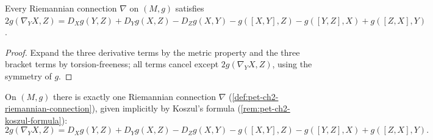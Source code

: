 \begin{lemma}
  \label{lem:pet-ch2-riemannian-connection-koszul}
  \leanok
  Every Riemannian connection $\nabla$ on $(M,g)$ satisfies
  $2g(\nabla_YX,Z)=D_Xg(Y,Z)+D_Yg(X,Z)-D_Zg(X,Y)
  -g([X,Y],Z)-g([Y,Z],X)+g([Z,X],Y)$.
\end{lemma}
\begin{proof}
  \leanok
  Expand the three derivative terms by the metric property and the three
  bracket terms by torsion-freeness; all terms cancel except
  $2g(\nabla_YX,Z)$, using the symmetry of $g$.
\end{proof}

\begin{theorem}
  \label{thm:pet-ch2-fundamental-theorem}
  \leanok
  On $(M,g)$ there is exactly one Riemannian connection $\nabla$
  (\cref{def:pet-ch2-riemannian-connection}), given implicitly by Koszul's
  formula (\cref{rem:pet-ch2-koszul-formula}):
  \[
    2g(\nabla_YX,Z)=D_Xg(Y,Z)+D_Yg(X,Z)-D_Zg(X,Y)
    -g([X,Y],Z)-g([Y,Z],X)+g([Z,X],Y).
  \]
\end{theorem}
